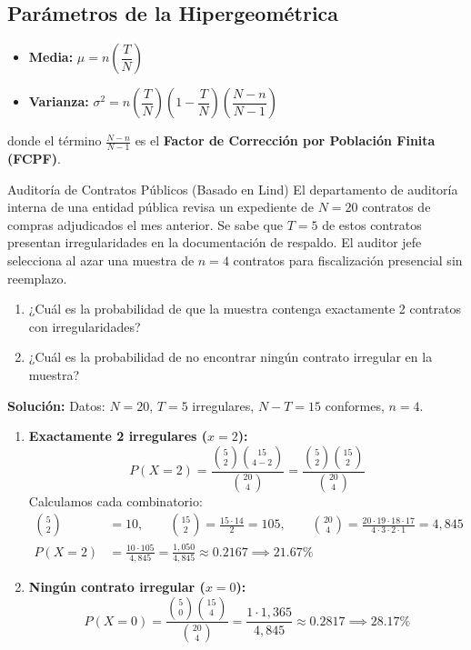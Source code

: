\subsection{Parámetros de la Hipergeométrica}
\begin{itemize}
    \item \textbf{Media:} $\mu = n \left( \dfrac{T}{N} \right)$
    \item \textbf{Varianza:} $\sigma^2 = n \left( \dfrac{T}{N} \right) \left( 1 - \dfrac{T}{N} \right) \left( \dfrac{N - n}{N - 1} \right)$
\end{itemize}
donde el término $\frac{N-n}{N-1}$ es el \textbf{Factor de Corrección por Población Finita (FCPF)}.

\begin{ejemplo}{Auditoría de Contratos Públicos (Basado en Lind)}
El departamento de auditoría interna de una entidad pública revisa un expediente de $N = 20$ contratos de compras adjudicados el mes anterior. Se sabe que $T = 5$ de estos contratos presentan irregularidades en la documentación de respaldo. El auditor jefe selecciona al azar una muestra de $n = 4$ contratos para fiscalización presencial sin reemplazo.
\begin{enumerate}[label=\alph*)]
    \item ¿Cuál es la probabilidad de que la muestra contenga exactamente 2 contratos con irregularidades?
    \item ¿Cuál es la probabilidad de no encontrar ningún contrato irregular en la muestra?
\end{enumerate}

\tcbline
\textbf{Solución:}
Datos: $N = 20$, $T = 5$ irregulares, $N - T = 15$ conformes, $n = 4$.
\begin{enumerate}[label=\alph*)]
    \item \textbf{Exactamente 2 irregulares ($x = 2$):}
    \[
    P(X = 2) = \frac{\binom{5}{2} \binom{15}{4-2}}{\binom{20}{4}} = \frac{\binom{5}{2} \binom{15}{2}}{\binom{20}{4}}
    \]
    Calculamos cada combinatorio:
    \begin{align*}
        \binom{5}{2} &= 10, \qquad \binom{15}{2} = \frac{15 \cdot 14}{2} = 105, \qquad \binom{20}{4} = \frac{20 \cdot 19 \cdot 18 \cdot 17}{4 \cdot 3 \cdot 2 \cdot 1} = 4{,}845 \\
        P(X = 2) &= \frac{10 \cdot 105}{4{,}845} = \frac{1{,}050}{4{,}845} \approx 0.2167 \implies 21.67\%
    \end{align*}
    \item \textbf{Ningún contrato irregular ($x = 0$):}
    \[
    P(X = 0) = \frac{\binom{5}{0} \binom{15}{4}}{\binom{20}{4}} = \frac{1 \cdot 1{,}365}{4{,}845} \approx 0.2817 \implies 28.17\%
    \]
\end{enumerate}
\end{ejemplo}

